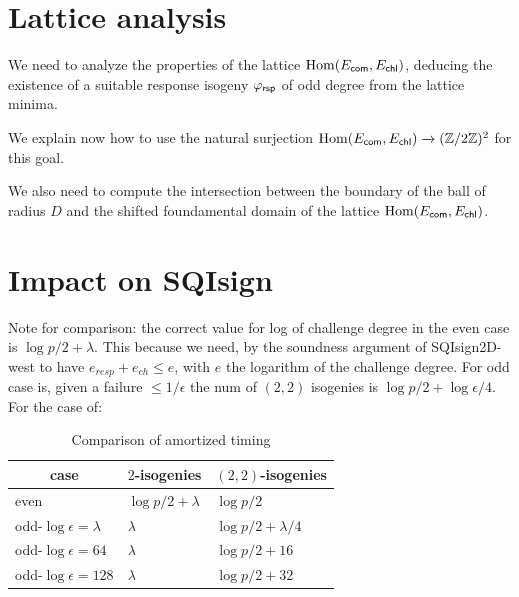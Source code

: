 \documentclass[envcountsect,envcountsame,orivec,runningheads,a4paper]{llncs}
\begin{document}
\section{Lattice analysis}
We need to analyze the properties of the lattice $\operatorname{Hom}(E_{\mathsf{com}}, E_{\mathsf{chl}})$, deducing the existence of a suitable response isogeny $\varphi_{\mathsf{rsp}}$ of odd degree from the lattice minima.

We explain now how to use the natural surjection $\operatorname{Hom}(E_{\mathsf{com}}, E_{\mathsf{chl}}) \xrightarrow{} (\mathbb{Z}/2\mathbb{Z})^2$ for this goal.


We also need to compute the intersection between the boundary of the ball of radius $D$ and the shifted foundamental domain of the lattice $\operatorname{Hom}(E_{\mathsf{com}}, E_{\mathsf{chl}})$.



\section{Impact on SQIsign}
Note for comparison: the correct value for log of challenge degree in the even case is $\log p / 2 + \lambda$.
This because we need, by the soundness argument of SQIsign2D-west to have $e_{resp} + e_{ch} \leq e$, with $e$ the logarithm of the challenge degree.
For odd case is, given a failure $\leq 1/\epsilon$ the num of $(2,2)$ isogenies is $\log p / 2 + \log \epsilon / 4$.
For the case of:

\begin{table}
    \caption{Comparison of amortized timing}\label{tab:timing}
    \begin{center}
        \begin{tabular}[c]{lll}
            \hline
            \multicolumn{1}{c}{\textbf{case}} & 
            \multicolumn{1}{c}{\textbf{$2$-isogenies}} &
            \multicolumn{1}{c}{\textbf{$(2,2)$-isogenies}} \\
            \hline
            even & $\log p / 2 + \lambda$ & $\log p / 2 $ \\
            odd-$\log \epsilon = {\lambda}$ & $ \lambda$ & $\log p / 2 + \lambda/4$ \\
            odd-$\log \epsilon = {64}$ & $ \lambda$ & $\log p / 2 + 16$ \\
            odd-$\log \epsilon = {128}$ & $ \lambda$ & $\log p / 2 + 32$ \\
            \hline
        \end{tabular}
    \end{center}
\end{table}
\end{document}
